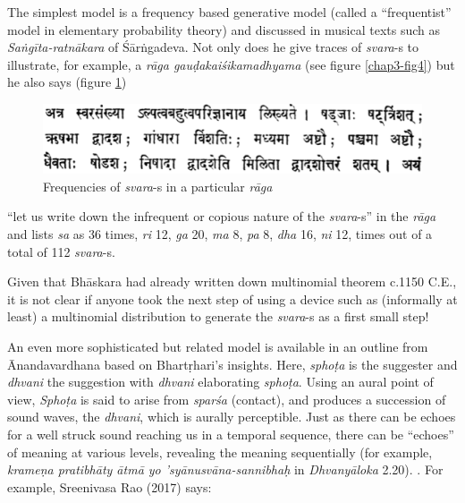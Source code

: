 The simplest model is a frequency based generative model (called a “frequentist” model in elementary probability theory) and discussed in musical texts such as \textsl{Saṅgīta-ratnākara} of Śārṅgadeva. Not only does he give traces of \textsl{svara}-s to illustrate, for example, a \textsl{rāga gauḍakaiśikamadhyama} (see figure \ref{chap3-fig4}) but he also says (figure \ref{chap3-fig3})
\begin{figure}[H]
\centering
\includegraphics[scale=.35]{figures/5.eps}
\caption{Frequencies of \textsl{svara}-s in a particular \textsl{rāga}}\label{chap3-fig3}
\end{figure}
“let us write down the infrequent or copious nature of the \textsl{svara}-s” in the \textsl{rāga} and lists \textsl{sa} as 36 times, \textsl{ri} 12, \textsl{ga} 20, \textsl{ma} 8, \textsl{pa} 8, \textsl{dha} 16, \textsl{ni} 12, times out of a total of 112 \textsl{svara}-s. 

Given that Bhāskara had already written down multinomial theorem c.1150 C.E., it is not clear if anyone took the next step of using a device such as (informally at least) a multinomial distribution to generate the \textsl{svara}-s as a first small step!

An even more sophisticated but related model is available in an outline from Ānandavardhana based on Bhartṛhari's insights. Here, \textsl{sphoṭa} is the suggester and \textsl{dhvani} the suggestion with \textsl{dhvani} elaborating \textsl{sphoṭa}. Using an aural point of view, \textsl{Sphoṭa} is said to arise from \textsl{sparśa} (contact), and produces a succession of sound waves, the \textsl{dhvani}, which is aurally perceptible. Just as there can be echoes for a well struck sound reaching us in a temporal sequence, there can be “echoes” of meaning at various levels, revealing the meaning sequentially (for example, \textsl{krameṇa pratibhāty ātmā yo 'syānusvāna-sannibhaḥ} in \textsl{Dhvanyāloka} 2.20). . For example, Sreenivasa Rao (2017) says:


